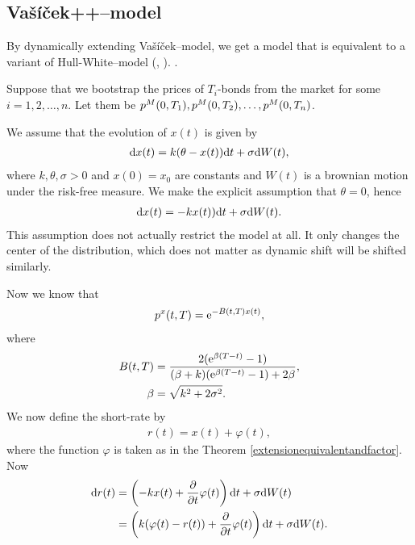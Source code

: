 \subsection{Va\v{s}\'{i}\v{c}ek++--model}
\label{sex:vasicek++}

By dynamically extending Va\v{s}\'{i}\v{c}ek--model, we get a model that is equivalent to a variant of Hull-White--model (\cite{hull1990pricing}, \cite{brigomercurio2001deterministic}).  \textcite[pp. 100--102]{brigo2007interest}.

Suppose that we bootstrap the prices of $T_i$-bonds from the market for some $i=1,2, \ldots, n$. Let them be $p^M(0,T_1), p^M(0,T_2), \ldots , p^M(0,T_n)$.

We assume that the evolution of $x(t)$ is given by
\begin{align}
\mathrm{d} x(t) = k ( \theta - x(t) ) \mathrm{d} t + \sigma \mathrm{d} W(t) ,
\end{align}
where $k, \theta, \sigma > 0$ and $x(0) = x_0$ are constants and $W(t)$ is a brownian motion under the risk-free measure. We make the explicit assumption that $\theta = 0$, hence
\begin{align}
\mathrm{d} x(t) = - k x(t) ) \mathrm{d} t + \sigma \mathrm{d} W(t) .
\end{align}
This assumption does not actually restrict the model at all. It only changes the center of the distribution, which does not matter as dynamic shift will be shifted similarly.

Now we know that
\begin{align}
p^x(t,T) = \mathrm{e}^{- B(t,T)x(t)} ,
\end{align}
where
\begin{align}
B(t,T) &= \frac{ 2(\mathrm{e}^{\beta(T-t)} - 1) }{ (\beta + k)(\mathrm{e}^{\beta(T-t)} - 1) + 2\beta }, \\
\beta &= \sqrt{k^2+ 2\sigma^2}	.	
\end{align}
We now define the short-rate by
	\begin{align}
		r(t) = x(t) + \varphi(t),
	\end{align}
where the function $\varphi$ is taken as in the Theorem \ref{extensionequivalentandfactor}. Now
	\begin{align}
		\mathrm{d} r(t) &= \left( -kx(t) + \frac{\partial}{\partial t} \varphi(t) \right) \mathrm{d} t + \sigma \mathrm{d} W(t) \\
			&= \left( k( \varphi(t) -r(t) ) + \frac{\partial}{\partial t} \varphi(t) \right) \mathrm{d} t + \sigma \mathrm{d} W(t) .
	\end{align}
	
